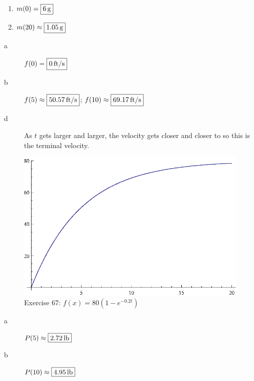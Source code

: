 \documentclass{exam}
\begin{document}
\begin{description}
      \item[66]
        \begin{enumerate}[a]
          \item $m(0) = \boxed{\unit[6]{g}}$
          \item $m(20) \approx \boxed{\unit[1.05]{g}}$
        \end{enumerate}

      \pagebreak

      \item[67]
        \begin{description}
          \item[a] $f(0) = \boxed{\unit[0]{ft/s}}$

          \item[b] $f(5) \approx \boxed{\unit[50.57]{ft/s}}$; $f(10) \approx \boxed{\unit[69.17]{ft/s}}$

          \item[d] As $t$ gets larger and larger, the velocity gets closer and closer to  so
            this is the terminal velocity.

        \end{description}

        \item
          \begin{figure}[H]
            \centering
            \includegraphics[scale=0.9]{exercise67.eps}
            \caption*{Exercise 67: $f(x) = 80 \left( 1 - e^{-0.2t} \right)$}
          \end{figure}

      \item[68]
        \begin{description}
          \item[a] $P(5) \approx \boxed{\unit[2.72]{lb}}$
          \item[b] $P(10) \approx \boxed{\unit[4.95]{lb}}$


\end{description}
\end{description}
\end{document}
